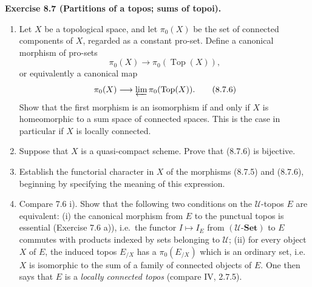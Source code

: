 \documentclass[11pt]{article}
\newcommand{\U}{\mathcal{U}}
\newcommand{\Set}{\mathbf{Set}}
\newcommand{\Top}{\operatorname{Top}}
\newcommand{\ie}{i.e.}
\newenvironment{remarktext}[1]{\par\medskip\noindent\textbf{#1.}\ }{\par\medskip}
\begin{document}
\begin{remarktext}{Exercise 8.7 (Partitions of a topos; sums of topoi)}
\begin{enumerate}[label=\alph*)]
\item Let \(X\) be a topological space, and let \(\pi_0(X)\) be the set of connected components of \(X\), regarded as a constant pro-set. Define a canonical morphism of pro-sets
\begin{equation*}
\pi_0(X)\longrightarrow\pi_0(\Top(X)),\tag{8.7.5}
\end{equation*}
or equivalently a canonical map
\begin{equation*}
\pi_0(X)\longrightarrow\varprojlim\pi_0(\Top(X)).\tag{8.7.6}
\end{equation*}
Show that the first morphism is an isomorphism if and only if \(X\) is homeomorphic to a sum space of connected spaces. This is the case in particular if \(X\) is locally connected.

\item Suppose that \(X\) is a quasi-compact scheme. Prove that (8.7.6) is bijective.

\item Establish the functorial character in \(X\) of the morphisms (8.7.5) and (8.7.6), beginning by specifying the meaning of this expression.

\item Compare 7.6 i). Show that the following two conditions on the \(\U\)-topos \(E\) are equivalent: (i) the canonical morphism from \(E\) to the punctual topos is essential (Exercise 7.6 a)), \ie\ the functor \(I\mapsto I_E\) from \((\U\text{-}\Set)\) to \(E\) commutes with products indexed by sets belonging to \(\U\); (ii) for every object \(X\) of \(E\), the induced topos \(E_{/X}\) has a \(\pi_0(E_{/X})\) which is an ordinary set, \ie\ \(X\) is isomorphic to the sum of a family of connected objects of \(E\). One then says that \(E\) is a \emph{locally connected topos} (compare IV, 2.7.5).
\end{enumerate}
\end{remarktext}
\end{document}
